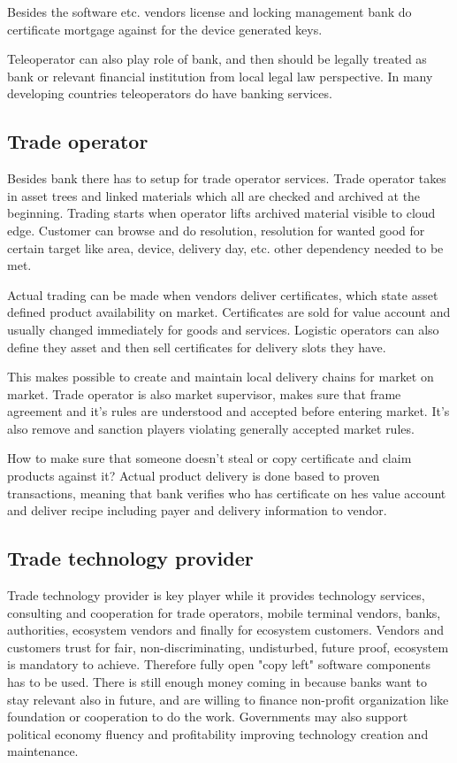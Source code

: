 Besides the software etc. vendors license and locking management bank do
certificate mortgage against for the device generated keys.

Teleoperator can also play role of bank, and then should be legally treated as
bank or relevant financial institution from local legal law perspective. In
many developing countries teleoperators do have banking services.

\subsection{Trade operator}
\label{trade_operator}
Besides bank there has to setup for trade operator services. Trade operator
takes in asset trees and linked materials which all are checked and archived
at the beginning. Trading starts when operator lifts archived material
visible to cloud edge. Customer can browse and do resolution, resolution for
wanted good for certain target like area, device, delivery day, etc. other
dependency needed to be met. 

Actual trading can be made when vendors deliver certificates, which state
asset defined product availability on market. Certificates are sold for value
account and usually changed immediately for goods and services. Logistic
operators can also define they asset and then sell certificates for delivery
slots they have.

This makes possible to create and maintain local delivery chains for market on
market. Trade operator is also market supervisor, makes sure that frame
agreement and it's rules are understood and accepted before entering market.
It's also remove and sanction players violating generally accepted market
rules.

How to make sure that someone doesn't steal or copy certificate and claim
products against it? Actual product delivery is done based to proven
transactions, meaning that bank verifies who has certificate on hes value
account and deliver recipe including payer and delivery information to vendor.

\subsection{Trade technology provider}
\label{tehnology_provider}

Trade technology provider is key player while it provides technology services,
consulting and cooperation for trade operators, mobile terminal vendors, banks,
authorities, ecosystem vendors and finally for ecosystem customers. Vendors and
customers trust for fair, non-discriminating, undisturbed, future proof,
ecosystem is mandatory to achieve. Therefore fully open "copy left" software
components has to be used. There is still enough money coming in because banks
want to stay relevant also in future, and are willing to finance non-profit
organization like foundation or cooperation to do the work. Governments may
also support political economy fluency and profitability improving technology
creation and maintenance.

